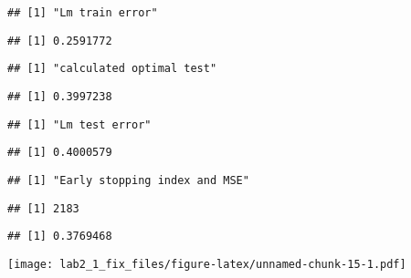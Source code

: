 \documentclass[
]{article}
\begin{document}
\begin{verbatim}
## [1] "Lm train error"
\end{verbatim}

\begin{verbatim}
## [1] 0.2591772
\end{verbatim}

\begin{verbatim}
## [1] "calculated optimal test"
\end{verbatim}

\begin{verbatim}
## [1] 0.3997238
\end{verbatim}

\begin{verbatim}
## [1] "Lm test error"
\end{verbatim}

\begin{verbatim}
## [1] 0.4000579
\end{verbatim}

\begin{verbatim}
## [1] "Early stopping index and MSE"
\end{verbatim}

\begin{verbatim}
## [1] 2183
\end{verbatim}

\begin{verbatim}
## [1] 0.3769468
\end{verbatim}

\texttt{[image: lab2\_1\_fix\_files/figure-latex/unnamed-chunk-15-1.pdf]}
\end{document}
